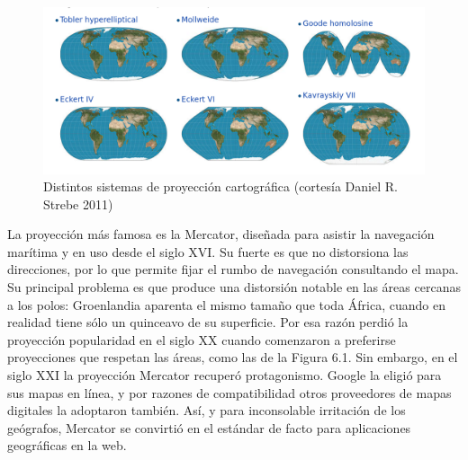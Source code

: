 \documentclass[]{book}
\begin{document}
\begin{figure}
\includegraphics[width=1\linewidth]{imagenes/proyecciones} \caption{Distintos sistemas de proyección cartográfica (cortesía Daniel R. Strebe 2011)}\label{fig:unnamed-chunk-137}
\end{figure}

La proyección más famosa es la Mercator, diseñada para asistir la
navegación marítima y en uso desde el siglo XVI. Su fuerte es que no
distorsiona las direcciones, por lo que permite fijar el rumbo de
navegación consultando el mapa. Su principal problema es que produce una
distorsión notable en las áreas cercanas a los polos: Groenlandia
aparenta el mismo tamaño que toda África, cuando en realidad tiene sólo
un quinceavo de su superficie. Por esa razón perdió la proyección
popularidad en el siglo XX cuando comenzaron a preferirse proyecciones
que respetan las áreas, como las de la Figura 6.1. Sin embargo, en el
siglo XXI la proyección Mercator recuperó protagonismo. Google la eligió
para sus mapas en línea, y por razones de compatibilidad otros
proveedores de mapas digitales la adoptaron también. Así, y para
inconsolable irritación de los geógrafos, Mercator se convirtió en el
estándar de facto para aplicaciones geográficas en la web.
\end{document}
